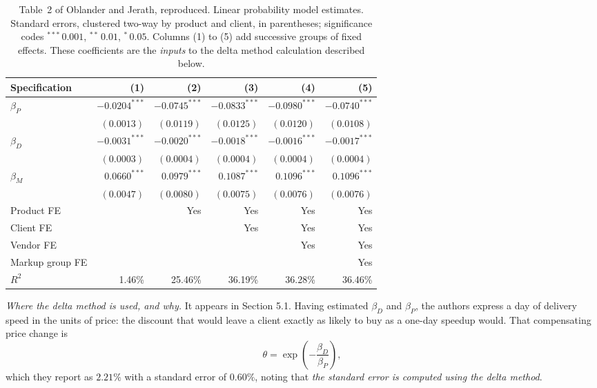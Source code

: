 \documentclass[11pt]{article}
\begin{document}
\begin{table}[htbp]
\centering
\caption{Table~2 of Oblander and Jerath, reproduced. Linear probability model
estimates. Standard errors, clustered two-way by product and client, in
parentheses; significance codes ${}^{***}\,0.001$, ${}^{**}\,0.01$,
${}^{*}\,0.05$. Columns (1) to (5) add successive groups of fixed effects.
These coefficients are the \emph{inputs} to the delta method calculation
described below.}
\label{tab:q6}
\footnotesize
\setlength{\tabcolsep}{5pt}
\begin{tabular}{lrrrrr}
\toprule
Specification & (1) & (2) & (3) & (4) & (5) \\
\midrule
$\beta_P$
  & $-0.0204^{***}$ & $-0.0745^{***}$ & $-0.0833^{***}$
  & $-0.0980^{***}$ & $-0.0740^{***}$ \\
  & $(0.0013)$ & $(0.0119)$ & $(0.0125)$ & $(0.0120)$ & $(0.0108)$ \\
$\beta_D$
  & $-0.0031^{***}$ & $-0.0020^{***}$ & $-0.0018^{***}$
  & $-0.0016^{***}$ & $-0.0017^{***}$ \\
  & $(0.0003)$ & $(0.0004)$ & $(0.0004)$ & $(0.0004)$ & $(0.0004)$ \\
$\beta_M$
  & $0.0660^{***}$ & $0.0979^{***}$ & $0.1087^{***}$
  & $0.1096^{***}$ & $0.1096^{***}$ \\
  & $(0.0047)$ & $(0.0080)$ & $(0.0075)$ & $(0.0076)$ & $(0.0076)$ \\
\addlinespace
\quad Product FE & & Yes & Yes & Yes & Yes \\
\quad Client FE & & & Yes & Yes & Yes \\
\quad Vendor FE & & & & Yes & Yes \\
\quad Markup group FE & & & & & Yes \\
\addlinespace
\quad $R^2$ & 1.46\% & 25.46\% & 36.19\% & 36.28\% & 36.46\% \\
\bottomrule
\end{tabular}
\end{table}

\emph{Where the delta method is used, and why.} It appears in Section 5.1. Having estimated $\beta_D$ and $\beta_P$, the authors express a day
of delivery speed in the units of price: the discount that would leave a client
exactly as likely to buy as a one-day speedup would. That compensating price
change is
\[
\theta = \exp\!\left(-\frac{\beta_D}{\beta_P}\right),
\]
which they report as $2.21\%$ with a standard error of $0.60\%$, noting that
\emph{the standard error is computed using the delta method}.
\end{document}
